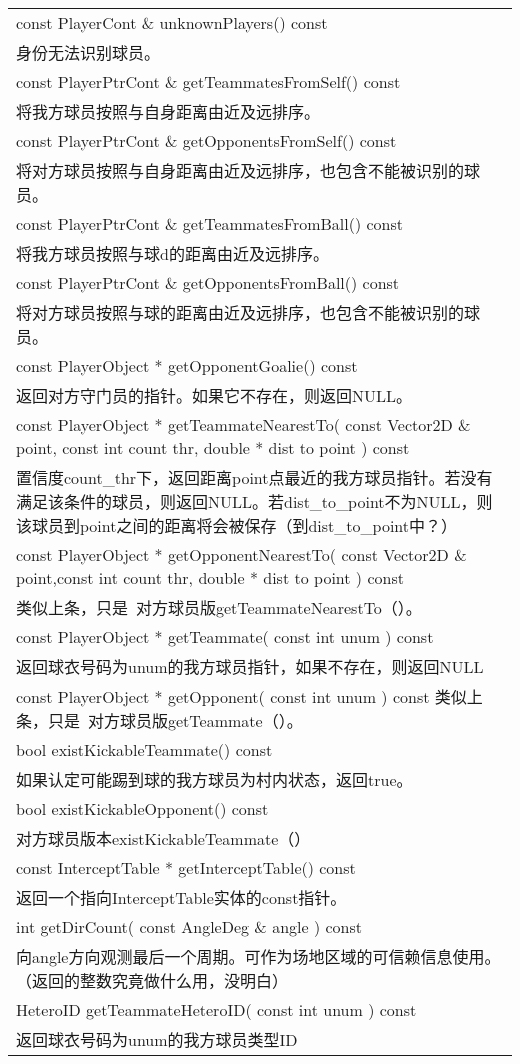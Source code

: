 \begin{tabular}{p{}}
	\hline
		const PlayerCont \& unknownPlayers() const\\
		身份无法识别球员。 \\
	\hline
		const PlayerPtrCont \& getTeammatesFromSelf() const\\
	将我方球员按照与自身距离由近及远排序。\\ 
	\hline
		const PlayerPtrCont \& getOpponentsFromSelf() const\\
		将对方球员按照与自身距离由近及远排序，也包含不能被识别的球员。\\
	\hline
		const PlayerPtrCont \& getTeammatesFromBall() const\\
		将我方球员按照与球d的距离由近及远排序。\\
	\hline
		const PlayerPtrCont \& getOpponentsFromBall() const\\
		将对方球员按照与球的距离由近及远排序，也包含不能被识别的球员。 \\
	\hline
		const PlayerObject * getOpponentGoalie() const\\
		返回对方守门员的指针。如果它不存在，则返回NULL。 \\
	\hline
		const PlayerObject * getTeammateNearestTo( const Vector2D \& point, const int count thr, double * dist to point ) const\\
		置信度count_thr下，返回距离point点最近的我方球员指针。若没有满足该条件的球员，则返回NULL。若dist_to_point不为NULL，则该球员到point之间的距离将会被保存（到dist_to_point中？） \\
	\hline
		const PlayerObject * getOpponentNearestTo( const Vector2D \& point,const int count thr, double * dist to point ) const\\
		类似上条，只是 对方球员版getTeammateNearestTo（）。\\
	\hline
		const PlayerObject * getTeammate( const int unum ) const\\
		返回球衣号码为unum的我方球员指针，如果不存在，则返回NULL\\
	\hline
		const PlayerObject * getOpponent( const int unum ) const 
		类似上条，只是 对方球员版getTeammate（）。\\
	\hline
		bool existKickableTeammate() const\\
		如果认定可能踢到球的我方球员为村内状态，返回true。 \\
	\hline
		bool existKickableOpponent() const\\
		对方球员版本existKickableTeammate（） \\
	\hline
		const InterceptTable * getInterceptTable() const\\
		返回一个指向InterceptTable实体的const指针。 \\
	\hline
		int getDirCount( const AngleDeg \& angle ) const\\
		向angle方向观测最后一个周期。可作为场地区域的可信赖信息使用。（返回的整数究竟做什么用，没明白） \\
	\hline
		HeteroID getTeammateHeteroID( const int unum ) const\\
		返回球衣号码为unum的我方球员类型ID \\
	\hline

\end{tabular}
